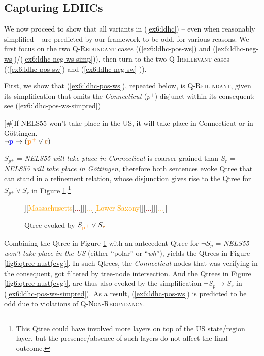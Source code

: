 \subsection{Capturing LDHCs}
We now proceed to show that all variants in (\ref{ex6:ldhc}) -- even when reasonably simplified -- are predicted by our framework to be odd, for various reasons. We first focus on the two \textsc{Q-Redundant} cases ((\ref{ex6:ldhc-pos-ws}) and (\ref{ex6:ldhc-neg-ws})/(\ref{ex6:ldhc-neg-ws-simp})), then turn to the two \textsc{Q-Irrelevant} cases ((\ref{ex6:ldhc-pos-sw}) and (\ref{ex6:ldhc-neg-sw}	)).

First, we show that (\ref{ex6:ldhc-pos-ws}), repeated below, is \textsc{Q-Redundant}, given its simplification that omits the \textit{Connecticut} ($p^+$) disjunct within its consequent; see (\ref{ex6:ldhc-pos-ws-simpred})

\begin{exe}
	[\#]{If NELS55 won't take place in the US, it will take place in Connecticut or in Göttingen.
		\\ $\neg\textbf{\textcolor{blue}{p}} \rightarrow (\textbf{\textcolor{orange}{p$^+$}}\vee\textbf{\textcolor{brown}{r}})$}
	\label{ex6:ldhc-pos-ws-simpred}
\end{exe}

$S_{p^+}$ = \textit{NELS55 will take place in Connecticut} is coarser-grained than $S_{r}$ = \textit{NELS55 will take place in Göttingen}, therefore both sentences evoke Qtree that can stand in a refinement relation, whose disjunction gives rise to the Qtree for $S_{p^+} \vee S_r$ in Figure \ref{fig6:qtree-cvg}.\footnote{This Qtree could have involved more layers on top of the US state/region layer, but the presence/absence of such layers do not affect the final outcome.} 

\begin{figure}[H]
	\centering
	\begin{forest}
		[CS[\fbox{\textcolor{orange}{Connecticut}}[\textcolor{brown}{New Haven}][\textcolor{brown}{...}]][\textcolor{orange}{Massachusetts}[\textcolor{brown}{...}]][\textcolor{orange}{...}][\textcolor{orange}{Lower Saxony}[\fbox{\textcolor{brown}{Göttingen}}][\textcolor{brown}{...}]][\textcolor{orange}{...}]]
	\end{forest}
	\caption[]{Qtree evoked by $S_{\textbf{\textcolor{orange}{p$^+$}}} \vee S_{\textbf{\textcolor{brown}{r}}}$}\label{fig6:qtree-cvg}
\end{figure}

Combining the Qtree in Figure \ref{fig6:qtree-cvg} with an antecedent Qtree for $\neg S_p$ = \textit{NELS55 won't take place in the US} (either ``polar'' or ``\textit{wh}''), yields the Qtrees in Figure \ref{fig6:qtree-nust(cvg)}. In such Qtrees, the \textit{Connecticut} nodes that was verifying in the consequent, got filtered by tree-node intersection. And the Qtrees in Figure \ref{fig6:qtree-nust(cvg)}, are thus also evoked by the simplification $\neg S_p \rightarrow S_r$ in (\ref{ex6:ldhc-pos-ws-simpred}).  As a result, (\ref{ex6:ldhc-pos-ws}) is predicted to be odd due to violations of \textsc{Q-Non-Redundancy}.

